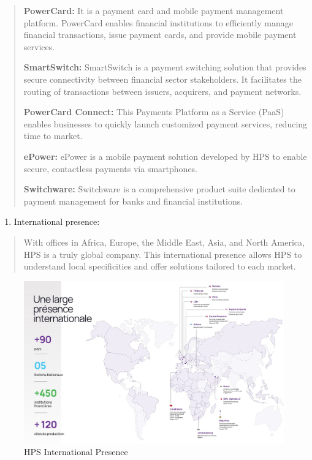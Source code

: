 \documentclass[12pt,a4paper]{report}
\begin{document}
\begin{quote}
\textbf{PowerCard:} It is a payment card and mobile payment management
platform. PowerCard enables financial institutions to efficiently manage
financial transactions, issue payment cards, and provide mobile payment
services.

\textbf{SmartSwitch:} SmartSwitch is a payment switching solution that
provides secure connectivity between financial sector stakeholders. It
facilitates the routing of transactions between issuers, acquirers, and
payment networks.

\textbf{PowerCard Connect:} This Payments Platform as a Service (PaaS)
enables businesses to quickly launch customized payment services,
reducing time to market.

\textbf{ePower:} ePower is a mobile payment solution developed by HPS to
enable secure, contactless payments via smartphones.

\textbf{Switchware:} Switchware is a comprehensive product suite
dedicated to payment management for banks and financial institutions.
\end{quote}

\begin{enumerate}
\def\labelenumi{\arabic{enumi}.}
\setcounter{enumi}{5}
\item
  \protect\hypertarget{_Toc201954400}{}{}International presence:
\end{enumerate}

\begin{quote}
With offices in Africa, Europe, the Middle East, Asia, and North
America, HPS is a truly global company. This international presence
allows HPS to understand local specificities and offer solutions
tailored to each market.
\end{quote}

\begin{figure}[H]
\centering
\includegraphics[width=6in]{vertopal_d1b0b2209edd4c6aa8254f57daa0953b/media/image23.jpeg}
\caption{HPS International Presence}
\label{fig:intlPresence}
\end{figure}
\end{document}
